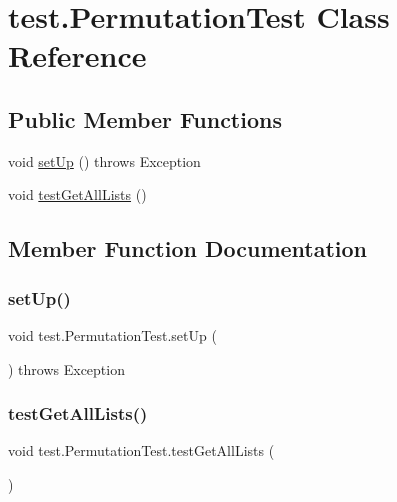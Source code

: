 \hypertarget{classtest_1_1_permutation_test}{}\section{test.\+Permutation\+Test Class Reference}
\label{classtest_1_1_permutation_test}
\subsection*{Public Member Functions}
\begin{DoxyCompactItemize}
\item 
void \hyperlink{classtest_1_1_permutation_test_a756de5f8b984a5f0ad77ea2e9d1e379d}{set\+Up} ()  throws Exception 
\item 
void \hyperlink{classtest_1_1_permutation_test_ad01c13d2d87644ae4bef6cac6e937801}{test\+Get\+All\+Lists} ()
\end{DoxyCompactItemize}


\subsection{Member Function Documentation}
\mbox{\label{classtest_1_1_permutation_test_a756de5f8b984a5f0ad77ea2e9d1e379d}} 
\subsubsection{\texorpdfstring{set\+Up()}{setUp()}}
{\footnotesize\ttfamily void test.\+Permutation\+Test.\+set\+Up (\begin{DoxyParamCaption}{ }\end{DoxyParamCaption}) throws Exception}

\mbox{\label{classtest_1_1_permutation_test_ad01c13d2d87644ae4bef6cac6e937801}} 
\subsubsection{\texorpdfstring{test\+Get\+All\+Lists()}{testGetAllLists()}}
{\footnotesize\ttfamily void test.\+Permutation\+Test.\+test\+Get\+All\+Lists (\begin{DoxyParamCaption}{ }\end{DoxyParamCaption})}

